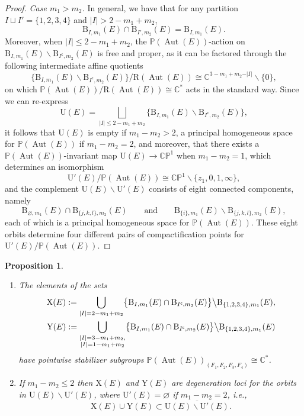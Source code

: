 \documentclass[pdftex]{sigma}
\newcommand{\field}[1]{\ensuremath{\mathbb{#1}}}
\newcommand{\CC}{\field{C}}
\newcommand{\PP}{\field{P}}
\DeclareMathOperator{\Aut}{Aut}
\numberwithin{equation}{section}
\newtheorem{Proposition}[Theorem]{Proposition}
 { \theoremstyle{definition}
\newtheorem{Definition}[Theorem]{Definition}
\newtheorem{Note}[Theorem]{Note}
\newtheorem{Example}[Theorem]{Example}
\newtheorem{Remark}[Theorem]{Remark} }
\begin{document}
\begin{proof}
\medskip\noindent\textit{Case $m_{1}>m_{2}$.}
In general, we have that for any partition $I\sqcup I' = \{1,2,3,4\}$ and $\vert I\vert > 2 - m_{1} + m_{2}$,
\[
\mathrm{B}_{I,m_{1}}(E)\cap\mathrm{B}_{I',m_{2}}(E) = \mathrm{B}_{I,m_{1}}(E).
\]
Moreover, when $\vert I\vert \leq 2 - m_{1} + m_{2}$, the $\PP(\Aut(E))$-action on $\mathrm{B}_{I,m_{1}}(E)\backslash \mathrm{B}_{I^{\mathsf{c}},m_{2}}(E)$ is free and proper, as it can be factored through the following intermediate affine quotients
\[
\bigl\{\mathrm{B}_{I,m_{1}}(E)\backslash\mathrm{B}_{I^{\mathsf{c}},m_{2}}(E)\bigr\}/\mathrm{R}(\Aut(E))\cong \CC^{3-m_{1}+m_{2}-\vert I\vert }\backslash\{0\},
\]
on which $\PP(\Aut (E))/\mathrm{R}(\Aut(E))\cong\CC^{*}$ acts in the standard way. Since we can re-express
\[
\mathrm{U}(E) = \bigsqcup_{\vert I\vert \leq 2-m_{1}+m_{2}}\bigl\{\mathrm{B}_{I,m_{1}}(E)\backslash\mathrm{B}_{I^{\mathsf{c}},m_{2}}(E)\bigr\},
\]
it follows that $\mathrm{U}(E)$ is empty if $m_{1}-m_{2}>2$, a principal homogeneous space for $\PP(\Aut(E))$ if $m_{1}-m_{2}=2$, and moreover, that there exists a $\PP(\Aut(E))$-invariant map $\mathrm{U}(E)\rightarrow \CC\PP^{1}$ when $m_{1}-m_{2}=1$, which determines an isomorphism
\[
\mathrm{U}'(E)/\PP(\Aut(E))\cong\CC\PP^{1}\backslash\{z_{1},0,1,\infty\},
\]
and the complement $\mathrm{U}(E)\backslash\mathrm{U}'(E)$ consists of eight connected components, namely
\[
\mathrm{B}_{\varnothing ,m_{1}}(E)\cap\mathrm{B}_{\{j,k,l\},m_{2}}(E)\qquad \text{and}\qquad \mathrm{B}_{\{i\},m_{1}}(E)\backslash\mathrm{B}_{\{j,k,l\},m_{2}}(E),
\]
each of which is a principal homogeneous space for $\PP(\Aut(E))$. These eight orbits determine four different pairs of compactification points for $\mathrm{U}'(E)/\PP(\Aut(E))$.
\end{proof}

\begin{Proposition}\label{prop:X-Y}\quad
\begin{enumerate}\itemsep=0pt
\item[$(i)$] The elements of the sets
\begin{gather*}
\mathrm{X}(E) :=
\displaystyle\bigcup_{\vert I\vert = 2 - m_{1}+m_{2}}\bigl\{\mathrm{B}_{I,m_{1}}(E)\cap\mathrm{B}_{I^{\mathsf{c}},m_{2}}(E)\bigr\} \big\backslash\mathrm{B}_{\{1,2,3,4\},m_{1}}(E),
\\
\mathrm{Y}(E) :=
\displaystyle\bigcup_{\substack{\vert I\vert = 3 - m_{1}+m_{2},\\\vert I\vert = 1 - m_{1}+m_{2}}}\bigl\{\mathrm{B}_{I,m_{1}}(E)\cap\mathrm{B}_{I^{\mathsf{c}},m_{2}}(E)\bigr\} \big\backslash\mathrm{B}_{\{1,2,3,4\},m_{1}}(E)
\end{gather*}
have pointwise stabilizer subgroups $\PP(\Aut(E))_{(F_{1},F_{2},F_{3},F_{4})}\cong \CC^{*}$.

\item[$(ii)$] If $m_{1}-m_{2} \leq 2$ then $\mathrm{X}(E)$ and $\mathrm{Y}(E)$ are degeneration loci for the orbits in $\mathrm{U}(E)\backslash \mathrm{U}'(E)$, where $\mathrm{U}'(E)=\varnothing $ if $m_{1}-m_{2}=2$, i.e.,
\[
\mathrm{X}(E)\cup \mathrm{Y}(E)\subset \overline{\mathrm{U}(E)\backslash\mathrm{U}'(E)}.
\]
\end{enumerate}
\end{Proposition}
\end{document}
